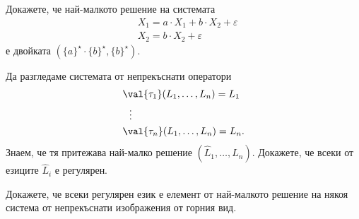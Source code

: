\begin{problem}
  Докажете, че най-малкото решение на системата 
  \begin{align*}
    & X_1 = a \cdot X_1 + b \cdot X_2 + \varepsilon\\
    & X_2 = b \cdot X_2 + \varepsilon
  \end{align*}
  е двойката $(\{a\}^\star \cdot \{b\}^\star, \{b\}^\star)$.
\end{problem}

\begin{problem}
  Да разгледаме системата от непрекъснати оператори
  \begin{align*}
    & \val{\tau_1}(L_1,\dots,L_n) = L_1\\
    & \ \ \vdots\\
    & \val{\tau_n}(L_1,\dots,L_n) = L_n.
  \end{align*}
  Знаем, че тя притежава най-малко решение $(\hat{L}_1,\dots,\hat{L}_n)$.
  Докажете, че всеки от езиците $\hat{L}_i$ е регулярен.

  Докажете, че всеки регулярен език е елемент от най-малкото решение 
  на някоя система от непрекъснати изображения от горния вид.
\end{problem}






